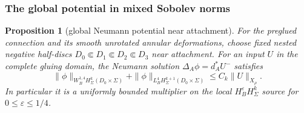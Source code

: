 \documentclass[11pt]{amsart}
\newtheorem{proposition}[theorem]{Proposition}
\theoremstyle{definition}
\theoremstyle{remark}
\theoremstyle{plain}
\begin{document}
\subsubsection{The global potential in mixed Sobolev norms}

\begin{proposition}[global Neumann potential near attachment]
\label{prop:excision-global-potential}
For the preglued connection and its smooth unrotated annular
deformations, choose fixed nested negative half-discs
$D_0\Subset D_1\Subset D_2\Subset D_3$ near attachment.
For an input $U$ in the complete gluing domain, the Neumann
solution $\Delta_A\phi=d_A^*U^-$ satisfies
\begin{equation}\label{eq:excision-global-potential}
 \|\phi\|_{W^{1,4}_BH^k_\Sigma(D_0\times\Sigma)}
   +\|\phi\|_{L^4_BH^{k+1}_\Sigma(D_0\times\Sigma)}
                                      \leq C_k\|U\|_{X_\rho}.
\end{equation}
In particular it is a uniformly bounded multiplier on the local
$H^\varepsilon_BH^k_\Sigma$ source for $0\leq\varepsilon\leq1/4$.
\end{proposition}
\end{document}
